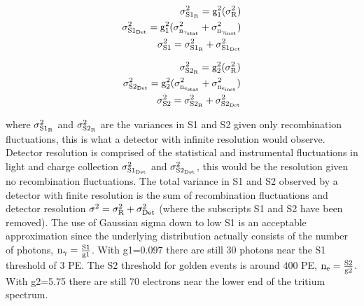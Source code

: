 \begin{equation}
\begin{split}
 \rm \sigma_{S1_R}^2=g_1^2(\sigma_R^2) \\
 \rm \sigma_{S1_{Det}}^2=g_1^2(\sigma_{n_{\gamma_{stat}}}^2+\sigma_{n_{\gamma_{inst}}}^2) \\
 \rm \sigma_{S1}^2=\sigma_{S1_R}^2 + \sigma_{S1_{Det}}^2
\label{eq:S1_res}
\end{split}
\end{equation}

\begin{equation}
\begin{split}
 \rm \sigma_{S2_R}^2=g_2^2(\sigma_R^2) \\
 \rm \sigma_{S2_{Det}}^2=g_2^2(\sigma_{n_{e_{stat}}}^2+\sigma_{n_{e_{inst}}}^2) \\
 \rm \sigma_{S2}^2=\sigma_{S2_R}^2 + \sigma_{S2_{Det}}^2
\label{eq:S2_res}
\end{split}
\end{equation}

\noindent where $\rm \sigma_{S1_R}^2$ and $\rm \sigma_{S2_R}^2$ are the variances in S1 and S2 given only recombination fluctuations, this is what a detector with infinite resolution would observe. Detector resolution is comprised of the statistical and instrumental fluctuations in light and charge collection $\rm  \sigma_{S1_{Det}}^2$ and $\rm  \sigma_{S2_{Det}}^2$, this would be the resolution given no recombination fluctuations. The total variance in S1 and S2 observed by a detector with finite resolution is the sum of recombination fluctuations and detector resolution $\rm \sigma^2=\sigma_{R}^2 + \sigma_{Det}^2$ (where the subscripts S1 and S2 have been removed).
The use of Gaussian sigma down to low S1 is an acceptable approximation since the underlying distribution actually consists of the number of photons, $\rm n_\gamma = \frac{S1}{g1}$. With g1=0.097 there are still 30 photons near the S1 threshold of 3 PE. The S2 threshold for golden events is around 400 PE, $\rm n_e = \frac{S2}{g2}$. With g2=5.75 there are still 70 electrons near the lower end of the tritium spectrum.





